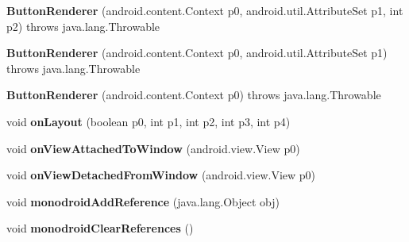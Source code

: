\begin{DoxyCompactItemize}
\item 
\mbox{\label{classmd5b60ffeb829f638581ab2bb9b1a7f4f3f_1_1_button_renderer_a44933cd78b3f547dc6c6282043506ae5}} 
{\bfseries Button\+Renderer} (android.\+content.\+Context p0, android.\+util.\+Attribute\+Set p1, int p2)  throws java.\+lang.\+Throwable 	
\item 
\mbox{\label{classmd5b60ffeb829f638581ab2bb9b1a7f4f3f_1_1_button_renderer_ae0d491f966e2aef899b84d42c9d2ae43}} 
{\bfseries Button\+Renderer} (android.\+content.\+Context p0, android.\+util.\+Attribute\+Set p1)  throws java.\+lang.\+Throwable 	
\item 
\mbox{\label{classmd5b60ffeb829f638581ab2bb9b1a7f4f3f_1_1_button_renderer_aef5f692cbf4180a0d0683aaaec08d3ae}} 
{\bfseries Button\+Renderer} (android.\+content.\+Context p0)  throws java.\+lang.\+Throwable 	
\item 
\mbox{\label{classmd5b60ffeb829f638581ab2bb9b1a7f4f3f_1_1_button_renderer_a32dc12b457387df026545663655ce4b2}} 
void {\bfseries on\+Layout} (boolean p0, int p1, int p2, int p3, int p4)
\item 
\mbox{\label{classmd5b60ffeb829f638581ab2bb9b1a7f4f3f_1_1_button_renderer_a545cf2b3c92707d187a93a08903f63ec}} 
void {\bfseries on\+View\+Attached\+To\+Window} (android.\+view.\+View p0)
\item 
\mbox{\label{classmd5b60ffeb829f638581ab2bb9b1a7f4f3f_1_1_button_renderer_aebd2e3c0410f099a12739d53789de61b}} 
void {\bfseries on\+View\+Detached\+From\+Window} (android.\+view.\+View p0)
\item 
\mbox{\label{classmd5b60ffeb829f638581ab2bb9b1a7f4f3f_1_1_button_renderer_a64b38ed3e683851f4be2246223c6cab5}} 
void {\bfseries monodroid\+Add\+Reference} (java.\+lang.\+Object obj)
\item 
\mbox{\label{classmd5b60ffeb829f638581ab2bb9b1a7f4f3f_1_1_button_renderer_a95654f418661c12f44eaabf4ec84d2d0}} 
void {\bfseries monodroid\+Clear\+References} ()
\end{DoxyCompactItemize}
